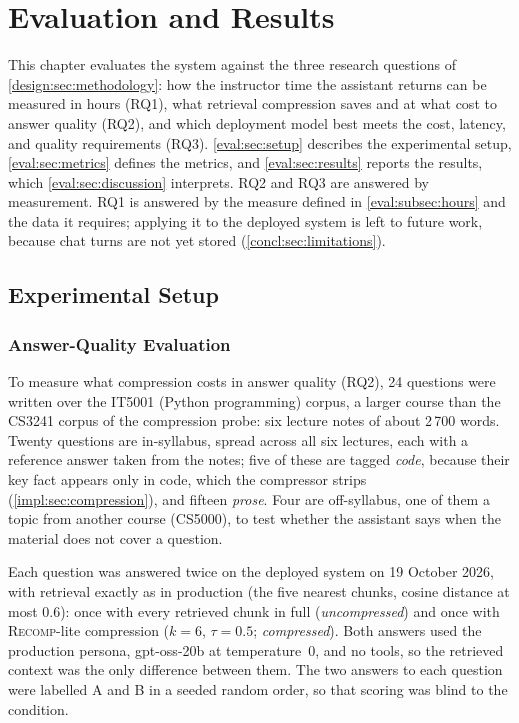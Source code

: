 \chapter{Evaluation and Results}
\label{ch:evaluation}
\vspace{2em}

This chapter evaluates the system against the three research questions of
\autoref{design:sec:methodology}: how the instructor time the assistant
returns can be measured in hours (RQ1), what retrieval compression saves and at what cost to answer
quality (RQ2), and which deployment model best meets the cost, latency, and
quality requirements (RQ3). \autoref{eval:sec:setup} describes the
experimental setup, \autoref{eval:sec:metrics} defines the metrics, and
\autoref{eval:sec:results} reports the results, which
\autoref{eval:sec:discussion} interprets. RQ2 and RQ3 are answered by
measurement. RQ1 is answered by the measure defined in
\autoref{eval:subsec:hours} and the data it requires; applying it to the
deployed system is left to future work, because chat turns are not yet
stored (\autoref{concl:sec:limitations}).

\section{Experimental Setup}
\label{eval:sec:setup}

\subsection{Answer-Quality Evaluation}
\label{eval:subsec:setup:quality}

To measure what compression costs in answer quality (RQ2), 24 questions were
written over the IT5001 (Python programming) corpus, a larger course than the
CS3241 corpus of the compression probe: six lecture notes of about 2\,700
words. Twenty questions are in-syllabus, spread across all six lectures, each
with a reference answer taken from the notes; five of these are tagged
\emph{code}, because their key fact appears only in code, which the
compressor strips (\autoref{impl:sec:compression}), and fifteen
\emph{prose}. Four are off-syllabus, one of them a topic from another course
(CS5000), to test whether the assistant says when the material does not cover
a question.

Each question was answered twice on the deployed system on 19 October 2026,
with retrieval exactly as in production (the five nearest chunks, cosine
distance at most 0.6): once with every retrieved chunk in full
(\emph{uncompressed}) and once with \textsc{Recomp}-lite compression ($k = 6$,
$\tau = 0.5$; \emph{compressed}). Both answers used the production persona,
gpt-oss-20b at temperature~0, and no tools, so the retrieved context was the
only difference between them. The two answers to each question were labelled
A and B in a seeded random order, so that scoring was blind to the condition.

